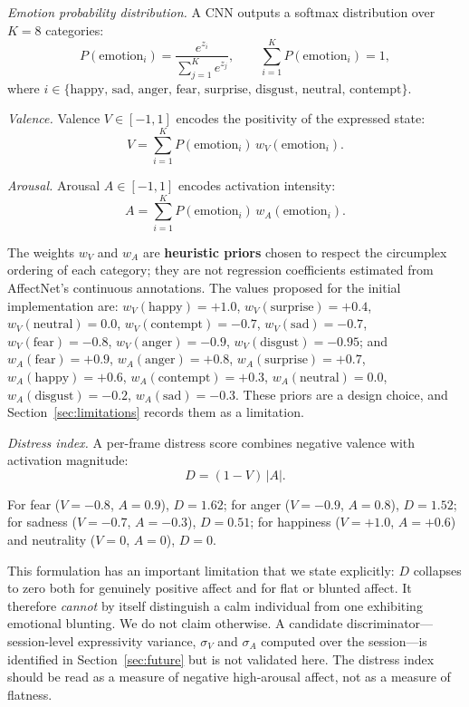 \documentclass[12pt]{article}
\begin{document}
\emph{Emotion probability distribution.} A CNN outputs a softmax
distribution over $K=8$ categories:
\begin{equation}
P(\text{emotion}_i) = \frac{e^{z_i}}{\sum_{j=1}^{K} e^{z_j}},
\qquad \sum_{i=1}^{K} P(\text{emotion}_i) = 1,
\end{equation}
where $i \in \{\text{happy, sad, anger, fear, surprise, disgust, neutral,
contempt}\}$.

\emph{Valence.} Valence $V\in[-1,1]$ encodes the positivity of the
expressed state:
\begin{equation}
V = \sum_{i=1}^{K} P(\text{emotion}_i)\,w_V(\text{emotion}_i).
\end{equation}

\emph{Arousal.} Arousal $A\in[-1,1]$ encodes activation intensity:
\begin{equation}
A = \sum_{i=1}^{K} P(\text{emotion}_i)\,w_A(\text{emotion}_i).
\end{equation}

\noindent The weights $w_V$ and $w_A$ are \textbf{heuristic priors}
chosen to respect the circumplex ordering of each category; they are
not regression coefficients estimated from AffectNet's continuous
annotations. The values proposed for the initial implementation are:
$w_V(\text{happy})=+1.0$, $w_V(\text{surprise})=+0.4$,
$w_V(\text{neutral})=0.0$, $w_V(\text{contempt})=-0.7$,
$w_V(\text{sad})=-0.7$, $w_V(\text{fear})=-0.8$,
$w_V(\text{anger})=-0.9$, $w_V(\text{disgust})=-0.95$; and
$w_A(\text{fear})=+0.9$, $w_A(\text{anger})=+0.8$,
$w_A(\text{surprise})=+0.7$, $w_A(\text{happy})=+0.6$,
$w_A(\text{contempt})=+0.3$, $w_A(\text{neutral})=0.0$,
$w_A(\text{disgust})=-0.2$, $w_A(\text{sad})=-0.3$. These priors are a
design choice, and Section~\ref{sec:limitations} records them as a
limitation.

\emph{Distress index.} A per-frame distress score combines negative
valence with activation magnitude:
\begin{equation}
D = (1 - V)\,|A| .
\end{equation}

\noindent For fear ($V=-0.8$, $A=0.9$), $D = 1.62$; for anger
($V=-0.9$, $A=0.8$), $D = 1.52$; for sadness ($V=-0.7$, $A=-0.3$),
$D = 0.51$; for happiness ($V=+1.0$, $A=+0.6$) and neutrality
($V=0$, $A=0$), $D = 0$.

This formulation has an important limitation that we state explicitly:
$D$ collapses to zero both for genuinely positive affect and for flat
or blunted affect. It therefore \emph{cannot} by itself distinguish a
calm individual from one exhibiting emotional blunting. We do not claim
otherwise. A candidate discriminator---session-level expressivity
variance, $\sigma_V$ and $\sigma_A$ computed over the session---is
identified in Section~\ref{sec:future} but is not validated here. The
distress index should be read as a measure of negative high-arousal
affect, not as a measure of flatness.
\end{document}
